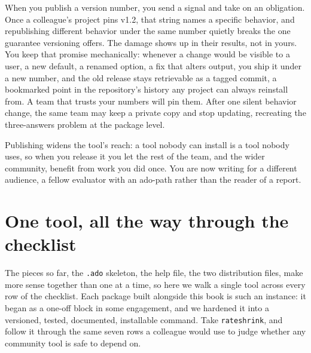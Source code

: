 When you publish a version number, you send a signal and take on an obligation. Once a colleague's project pins v1.2, that string names a specific behavior, and republishing different behavior under the same number quietly breaks the one guarantee versioning offers. The damage shows up in their results, not in yours. You keep that promise mechanically: whenever a change would be visible to a user, a new default, a renamed option, a fix that alters output, you ship it under a new number, and the old release stays retrievable as a tagged commit, a bookmarked point in the repository's history any project can always reinstall from. A team that trusts your numbers will pin them. After one silent behavior change, the same team may keep a private copy and stop updating, recreating the three-answers problem at the package level.

Publishing widens the tool's reach: a tool nobody can install is a tool nobody uses, so when you release it you let the rest of the team, and the wider community, benefit from work you did once. You are now writing for a different audience, a fellow evaluator with an ado-path rather than the reader of a report.

\section{One tool, all the way through the checklist}\label{sec:rateshrink-walk}
The pieces so far, the \texttt{.ado} skeleton, the help file, the two distribution files, make more sense together than one at a time, so here we walk a single tool across every row of the checklist. Each package built alongside this book is such an instance: it began as a one-off block in some engagement, and we hardened it into a versioned, tested, documented, installable command. Take \texttt{rateshrink}, and follow it through the same seven rows a colleague would use to judge whether any community tool is safe to depend on.

